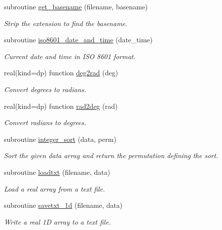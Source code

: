 \begin{DoxyCompactItemize}
subroutine \mbox{\hyperlink{namespacepmc__util_a4a6576eb74e7fb0c14d7190b44b62c5c}{get\+\_\+basename}} (filename, basename)
\begin{DoxyCompactList}\small\item\em Strip the extension to find the basename. \end{DoxyCompactList}\item 
subroutine \mbox{\hyperlink{namespacepmc__util_aac8c9feb22730857691a4de7b68a041f}{iso8601\+\_\+date\+\_\+and\+\_\+time}} (date\+\_\+time)
\begin{DoxyCompactList}\small\item\em Current date and time in I\+SO 8601 format. \end{DoxyCompactList}\item 
real(kind=dp) function \mbox{\hyperlink{namespacepmc__util_a46d994b9563ad325253e528f983cb3cc}{deg2rad}} (deg)
\begin{DoxyCompactList}\small\item\em Convert degrees to radians. \end{DoxyCompactList}\item 
real(kind=dp) function \mbox{\hyperlink{namespacepmc__util_aee025b9d181017a7c928195ae1148b27}{rad2deg}} (rad)
\begin{DoxyCompactList}\small\item\em Convert radians to degrees. \end{DoxyCompactList}\item 
subroutine \mbox{\hyperlink{namespacepmc__util_a32c8275ed718fa49d7ebd55eca41ef70}{integer\+\_\+sort}} (data, perm)
\begin{DoxyCompactList}\small\item\em Sort the given data array and return the permutation defining the sort. \end{DoxyCompactList}\item 
subroutine \mbox{\hyperlink{namespacepmc__util_a89e25708a94945ec739408bceef13762}{loadtxt}} (filename, data)
\begin{DoxyCompactList}\small\item\em Load a real array from a text file. \end{DoxyCompactList}\item 
subroutine \mbox{\hyperlink{namespacepmc__util_a22ca26ff282a9278ae95f877cb999786}{savetxt\+\_\+1d}} (filename, data)
\begin{DoxyCompactList}\small\item\em Write a real 1D array to a text file. \end{DoxyCompactList}\item 

\end{DoxyCompactItemize}

